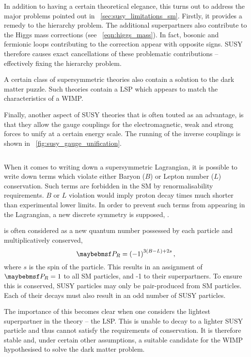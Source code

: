 In addition to having a certain theoretical elegance, this turns out to address
the major problems pointed out in \sec~\ref{sec:susy_limitations_sm}. Firstly,
it provides a remedy to the hierarchy problem. The additional superpartners also
contribute to the Higgs mass corrections (see \eqn~\ref{eqn:higgs_mass}). In
fact, bosonic and fermionic loops contributing to the correction appear with
opposite signs. \acl{SUSY} therefore causes exact cancellations of these
problematic contributions -- effectively fixing the hierarchy problem.

A certain class of supersymmetric theories also contain a solution to the dark
matter puzzle. Such theories contain a \acf{LSP} which appears to match the
characteristics of a \ac{WIMP}.

Finally, another aspect of \ac{SUSY} theories that is often touted as an
advantage, is that they allow the gauge couplings for the electromagnetic, weak
and strong forces to unify at a certain energy scale. The running of the inverse
couplings is shown in \fig~\ref{fig:susy_gauge_unification}.

\subsection[R-Parity]{\Rparity}
When it comes to writing down a supersymmetric Lagrangian, it is possible to
write down terms which violate either Baryon ($B$) or Lepton number ($L$)
conservation. Such terms are forbidden in the \ac{SM} by renormalisability
requirements. $B$ or $L$ violation would imply proton decay times much shorter
than experimental lower limits. In order to prevent such terms from appearing in
the Lagrangian, a new discrete symmetry is supposed, \Rparity.

\Rparity is often considered as a new quantum number possessed by each particle
and multiplicatively conserved,
\begin{equation*}
\PR = \left(-1\right)^{3(B-L)+2s},
\end{equation*}
where $s$ is the spin of the particle. This results in an assignment of $\PR =
1$ to all \ac{SM} particles, and -1 to their superpartners. To ensure this is
conserved, \ac{SUSY} particles may only be pair-produced from \ac{SM}
particles. Each of their decays must also result in an odd number of \ac{SUSY}
particles.

The importance of this becomes clear when one considers the lightest
superpartner in the theory -- the \ac{LSP}. This is unable to decay to a lighter
\ac{SUSY} particle and thus cannot satisfy the requirements of \Rparity
conservation. It is therefore stable and, under certain other assumptions, a
suitable candidate for the \ac{WIMP} hypothesised to solve the dark matter
problem.

